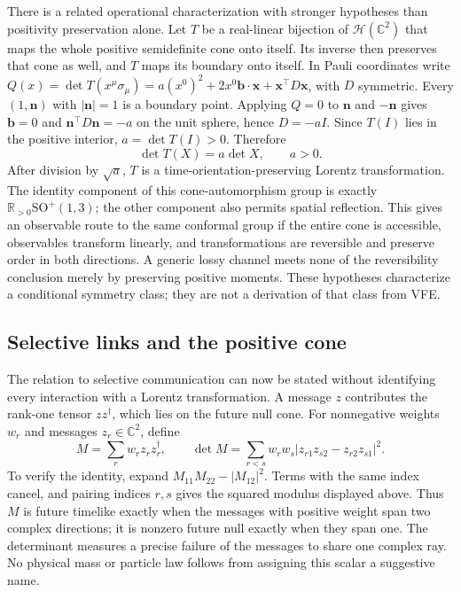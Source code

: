 There is a related operational characterization with stronger hypotheses than positivity preservation alone. Let $T$ be a real-linear bijection of $\mathcal H(\mathbb C^2)$ that maps the whole positive semidefinite cone onto itself. Its inverse then preserves that cone as well, and $T$ maps its boundary onto itself. In Pauli coordinates write $Q(x)=\det T(x^\mu\sigma_\mu)=a(x^0)^2+2x^0\boldsymbol b\cdot\boldsymbol x+\boldsymbol x^\top D\boldsymbol x$, with $D$ symmetric. Every $(1,\boldsymbol n)$ with $|\boldsymbol n|=1$ is a boundary point. Applying $Q=0$ to $\boldsymbol n$ and $-\boldsymbol n$ gives $\boldsymbol b=0$ and $\boldsymbol n^\top D\boldsymbol n=-a$ on the unit sphere, hence $D=-aI$. Since $T(I)$ lies in the positive interior, $a=\det T(I)>0$. Therefore
\begin{equation}
\det T(X)=a\det X,\qquad a>0.
\label{eq:lor-cone-automorphism}
\end{equation}
After division by $\sqrt a$, $T$ is a time-orientation-preserving Lorentz transformation. The identity component of this cone-automorphism group is exactly $\mathbb R_{>0}\mathrm{SO}^{+}(1,3)$; the other component also permits spatial reflection. This gives an observable route to the same conformal group if the entire cone is accessible, observables transform linearly, and transformations are reversible and preserve order in both directions. A generic lossy channel meets none of the reversibility conclusion merely by preserving positive moments. These hypotheses characterize a conditional symmetry class; they are not a derivation of that class from VFE.

\subsection{Selective links and the positive cone}

The relation to selective communication can now be stated without identifying every interaction with a Lorentz transformation. A message $z$ contributes the rank-one tensor $zz^\dagger$, which lies on the future null cone. For nonnegative weights $w_r$ and messages $z_r\in\mathbb C^2$, define
\begin{equation}
M=\sum_r w_rz_rz_r^\dagger,\qquad
\det M=\sum_{r<s}w_rw_s|z_{r1}z_{s2}-z_{r2}z_{s1}|^2.
\label{eq:lor-message-aggregation}
\end{equation}
To verify the identity, expand $M_{11}M_{22}-|M_{12}|^2$. Terms with the same index cancel, and pairing indices $r,s$ gives the squared modulus displayed above. Thus $M$ is future timelike exactly when the messages with positive weight span two complex directions; it is nonzero future null exactly when they span one. The determinant measures a precise failure of the messages to share one complex ray. No physical mass or particle law follows from assigning this scalar a suggestive name.

